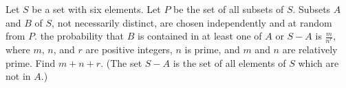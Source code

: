Let $S$ be a set with six elements. Let $P$ be the set of all subsets of $S.$ Subsets $A$ and $B$ of $S$, not necessarily distinct, are chosen independently and at random from $P$. the probability that $B$ is contained in at least one of $A$ or $S-A$ is $\frac{m}{n^{r}},$ where $m$, $n$, and $r$ are positive integers, $n$ is prime, and $m$ and $n$ are relatively prime. Find $m+n+r.$ (The set $S-A$ is the set of all elements of $S$ which are not in $A.$)